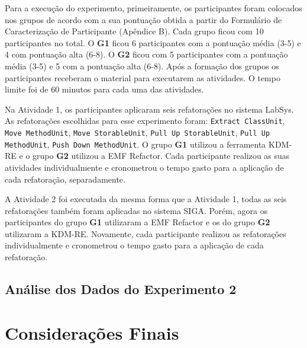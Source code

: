 Para a execução do experimento, primeiramente, os participantes foram colocados nos grupos de acordo com a sua pontuação obtida a partir do Formulário de Caracterização de Participante (Apêndice B). Cada grupo ficou com 10 participantes no total. O \textbf{G1} ficou 6 participantes com a pontuação média (3-5) e 4 com pontuação alta (6-8). O \textbf{G2} ficou com 5 participantes com a pontuação média (3-5) e 5 com a pontuação alta (6-8). Após a formação dos grupos os participantes receberam o material para executarem as atividades. O tempo limite foi de 60 minutos para cada uma das atividades.


Na Atividade 1, os participantes aplicaram seis refatorações no sistema LabSys. As refatorações escolhidas para esse experimento foram: \texttt{Extract ClassUnit}, \texttt{Move MethodUnit}, \texttt{Move StorableUnit}, \texttt{Pull Up StorableUnit}, \texttt{Pull Up MethodUnit}, \texttt{Push Down MethodUnit}. O grupo \textbf{G1} utilizou a ferramenta KDM-RE e o grupo \textbf{G2} utilizou a EMF Refactor. Cada participante realizou as suas atividades individualmente e cronometrou o tempo gasto para a aplicação de cada refatoração, separadamente.

A Atividade 2 foi executada da mesma forma que a Atividade 1, todas as seis refatorações também foram aplicadas no sistema SIGA. Porém, agora os participantes do grupo \textbf{G1} utilizaram a EMF Refactor e os do grupo \textbf{G2} utilizaram a KDM-RE. Novamente, cada participante realizou as refatorações individualmente e cronometrou o tempo gasto para a aplicação de cada refatoração.

\subsection{Análise dos Dados do Experimento 2}

\section{Considerações Finais}\label{sec:consideracoes_finais_experimento}